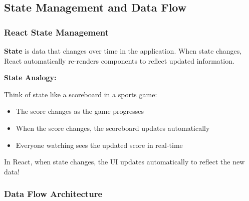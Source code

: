 \subsection{State Management and Data Flow}

\subsubsection{React State Management}

\textbf{State} is data that changes over time in the application. When state changes, React automatically re-renders components to reflect updated information.

\begin{mdframed}[backgroundcolor=blue!5, linecolor=blue!40, linewidth=2pt]
\textbf{State Analogy:}

Think of state like a scoreboard in a sports game:
\begin{itemize}
    \item The score changes as the game progresses
    \item When the score changes, the scoreboard updates automatically
    \item Everyone watching sees the updated score in real-time
\end{itemize}

In React, when state changes, the UI updates automatically to reflect the new data!
\end{mdframed}

\subsubsection{Data Flow Architecture}

